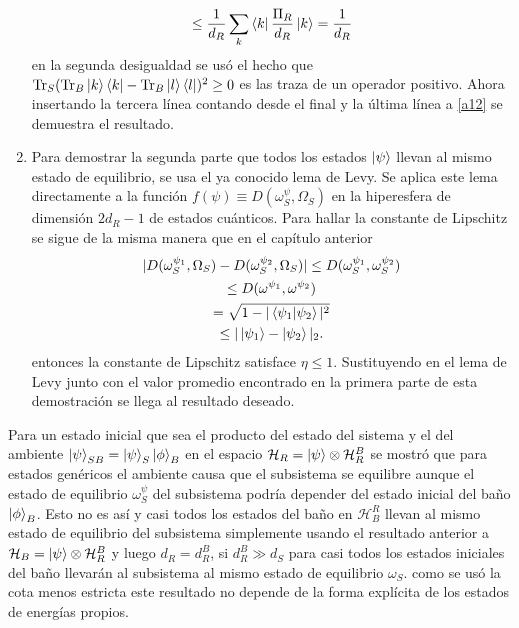 \begin{enumerate}
\begin{multline}
\leq \frac{1}{d_{R}} \sum_{k} \bra{k} \frac{\Pi_{R}}{d_{R}} \ket{k} = \frac{1}{d_{R}}
\end{multline}
en la segunda desigualdad se usó el hecho que $\Tr_{S} (\Tr_{B} \ket{k}\bra{k}-\Tr_{B} \ket{l}\bra{l})^{2}\geq 0$ es las traza de un operador positivo. Ahora insertando la tercera línea contando desde el final y la última línea a \ref{a12} se demuestra el resultado.
\item Para demostrar la segunda parte que todos los estados $\ket{\psi}$ llevan al mismo estado de equilibrio, se usa el ya conocido lema de Levy. Se aplica este lema directamente a la función $f(\psi) \equiv D(\omega_{S}^{\psi}, \Omega_{S})$ en la hiperesfera de dimensión $2d_{R}-1$ de estados cuánticos. Para hallar la constante de Lipschitz se sigue de la misma manera que en el capítulo anterior
\begin{multline}
|D(\omega_{S}^{\psi_{1}}, \Omega_{S})-D(\omega_{S}^{\psi_{2}},\Omega_{S})| \leq D(\omega_{S}^{\psi_{1}},\omega_{S}^{\psi_{2}})
\\
\leq D(\omega^{\psi_{1}},\omega^{\psi_{2}})
\\
= \sqrt{1- |\bra{\psi_{1}} \ket{\psi_{2}}|^{2}}
\\
\leq |\ket{\psi_{1}} - \ket{\psi_{2}}|_{2}.
\end{multline} 
entonces la constante de Lipschitz satisface $\eta \leq 1$. Sustituyendo en el lema de Levy junto con el valor promedio encontrado en la primera parte de esta demostración se llega al resultado deseado.
\\
\end{enumerate}

Para un estado inicial que sea el producto del estado del sistema y el del ambiente $\ket{\psi}_{SB}= \ket{\psi}_{S} \ket{\phi}_{B}$ en el espacio $\mathcal{H}_{R}=\ket{\psi} \otimes \mathcal{H}_{R}^{B}$ se mostró que para estados genéricos el ambiente causa que el subsistema se equilibre aunque el estado de equilibrio $\omega_{S}^{\psi}$ del subsistema podría  depender del estado inicial del baño $\ket{\phi}_{B}$. Esto no es así y casi todos los estados del baño en $\mathcal{H}_{B}^{R}$ llevan al mismo estado de equilibrio del subsistema simplemente usando el resultado anterior a  $\mathcal{H}_{B} = \ket{\psi}\otimes \mathcal{H}_{R}^{B}$ y luego $d_{R} = d_{R}^{B}$, si $d_{R}^{B} \gg d_{S}$ para casi todos los estados iniciales del baño llevarán al subsistema al mismo estado de equilibrio $\omega_{S}$. como se usó la cota menos estricta este resultado no depende de la forma explícita de los estados de energías propios.
\\

